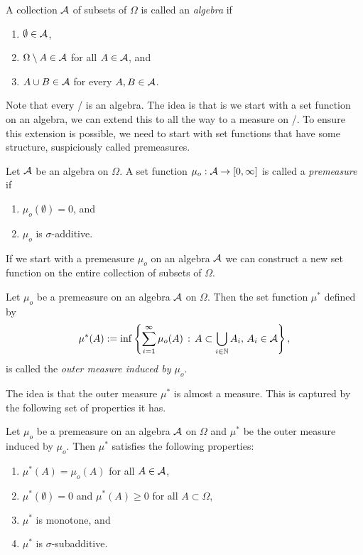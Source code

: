 \begin{definition}
A collection $\mathcal A$ of subsets of $\Omega$ is called an \emph{algebra} if
\begin{enumerate}
\item $\emptyset \in \mathcal A$,
\item $\Omega \setminus A \in \mathcal A$ for all $A \in \mathcal A$, and
\item $A \cup B \in \mathcal A$ for every $A, B \in \mathcal A$.
\end{enumerate}
\end{definition}

Note that every \sigalg/ is an algebra. The idea is that is we start with a set function on an algebra, we can extend this to all the way to a measure on \sigalg/. To ensure this extension is possible, we need to start with set functions that have some structure, suspiciously called premeasures. 

\begin{definition}[Premeasures]
Let $\mathcal A$ be an algebra on $\Omega$. A set function $\mu_o : \mathcal A \to [0,\infty]$ is called a \emph{premeasure} if
\begin{enumerate}
\item $\mu_o(\emptyset) = 0$, and
\item $\mu_o$ is $\sigma$-additive.
\end{enumerate}
\end{definition}

If we start with a premeasure $\mu_o$ on an algebra $\mathcal A$ we can construct a new set function on the entire collection of subsets of $\Omega$.

\begin{definition}
Let $\mu_o$ be a premeasure on an algebra $\mathcal A$ on $\Omega$. Then the set function $\mu^\ast$ defined by
\[
	\mu^\ast(A) := \inf \left\{\sum_{i = 1}^\infty \mu_o(A) \, : \, A \subset \bigcup_{i \in \mathbb N} A_i, \, A_i \in \mathcal A\right\},
\]
is called the \emph{outer measure induced by $\mu_o$}. 
\end{definition}

The idea is that the outer measure $\mu^\ast$ is almost a measure. This is captured by the following set of properties it has.

\begin{proposition}
Let $\mu_o$ be a premeasure on an algebra $\mathcal A$ on $\Omega$ and $\mu^\ast$ be the outer measure induced by $\mu_o$. Then $\mu^\ast$ satisfies the following properties:
\begin{enumerate}
\item $\mu^\ast(A) = \mu_o(A)$ for all $A \in \mathcal A$,
\item $\mu^\ast(\emptyset) = 0$ and $\mu^\ast(A) \ge 0$ for all $A \subset \Omega$,
\item $\mu^\ast$ is monotone, and
\item $\mu^\ast$ is $\sigma$-subadditive.
\end{enumerate}
\end{proposition}

